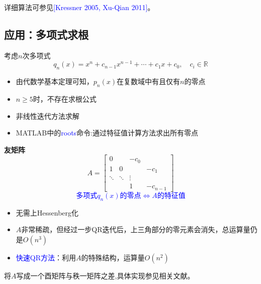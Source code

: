 \documentclass[12pt,a4paper]{article}
\begin{document}
详细算法可参见\textcolor{blue}{[Kressner 2005, Xu-Qian 2011]}。
\subsection{应用：多项式求根}
考虑$n$次多项式$$
q_{n}(x)=x^{n}+c_{n-1} x^{n-1}+\cdots+c_{1} x+c_{0}, \quad c_{i} \in \mathbb{R}
$$
\begin{itemize}
	\item 由代数学基本定理可知，$p_n(x)$在复数域中有且仅有$n$的零点
	\item $n\geq 5$时，不存在求根公式
	\item 非线性迭代方法求解
	\item MATLAB中的\textcolor{blue}{roots}命令:通过特征值计算方法求出所有零点
\end{itemize}
\textbf{友矩阵}
$$
A=\left[\begin{array}{cccc}{0} & {} & {-c_{0}} \\ {1} & {0} & {} & {-c_{1}} \\ {\ddots} & {\ddots} & {\vdots} \\ {} & {} & {1} & {-c_{n-1}}\end{array}\right]
$$
\textcolor{blue}{$$
	\text{多项式}q_n(x) \text{的零点}\Longleftrightarrow A\text{的特征值}
	$$}
\begin{itemize}
	\item 无需上Hessenberg化
	\item $A$非常稀疏，但经过一步QR迭代后，上三角部分的零元素会消失，总运算量仍是$O\left(n^{3}\right)$
	\item \textcolor{blue}{快速QR方法}：利用$A$的特殊结构，运算量$O\left(n^{2}\right)$
\end{itemize}
将$A$写成一个酉矩阵与秩一矩阵之差,具体实现参见相关文献。
\end{document}
